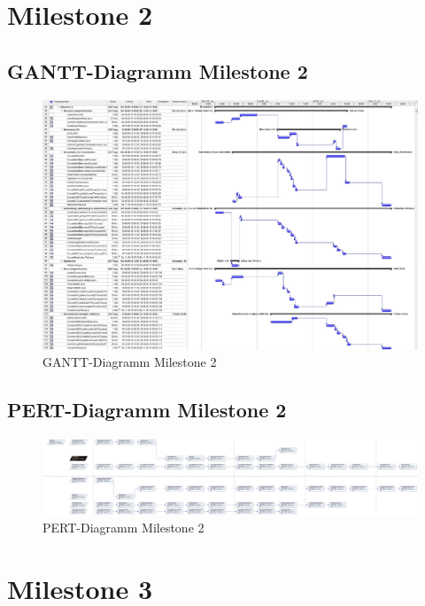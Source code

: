 \section{Milestone 2}
\subsection{GANTT-Diagramm Milestone 2}
\begin{figure}[h]
	\centering
	\includegraphics[width=1.4\linewidth, angle=90]{Grafiken/Milestone2Gantt}
	\caption{GANTT-Diagramm Milestone 2}
	\label{fig:GANTT-Diagramm Milestone 2}
\end{figure}


\subsection{PERT-Diagramm Milestone 2}
\begin{figure}[h]
	\centering
	\includegraphics[width=1.4\linewidth, angle=90]{Grafiken/Milestone2Pert}
	\caption{PERT-Diagramm Milestone 2}
	\label{fig:PERT-Diagramm Milestone 2}
\end{figure}


\section{Milestone 3}

